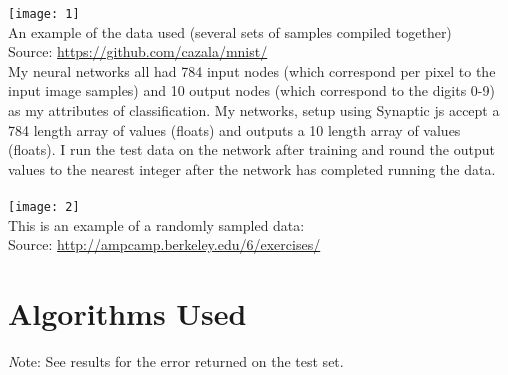 \documentclass[11pt]{article}
\begin{document}
\begin{page}
\texttt{[image: 1]}\\
An example of the data used (several sets of samples compiled together) \\
Source: \url{https://github.com/cazala/mnist/}\\

\noindent My neural networks all had 784 input nodes (which correspond per pixel to the input image samples) and 10 output nodes (which correspond to the digits 0-9) as my attributes of classification. My networks, setup using Synaptic js accept a 784 length array of values (floats) and outputs a 10 length array of values (floats). I run the test data on the network after training and round the output values to the nearest integer after the network has completed running the data. \\\\

\texttt{[image: 2]}\\
This is an example of a randomly sampled data:\\
Source: \url{http://ampcamp.berkeley.edu/6/exercises/} 


\section{Algorithms Used}
\emph Note: See results for the error returned on the test set.\\
 

\end{page}
\end{document}
